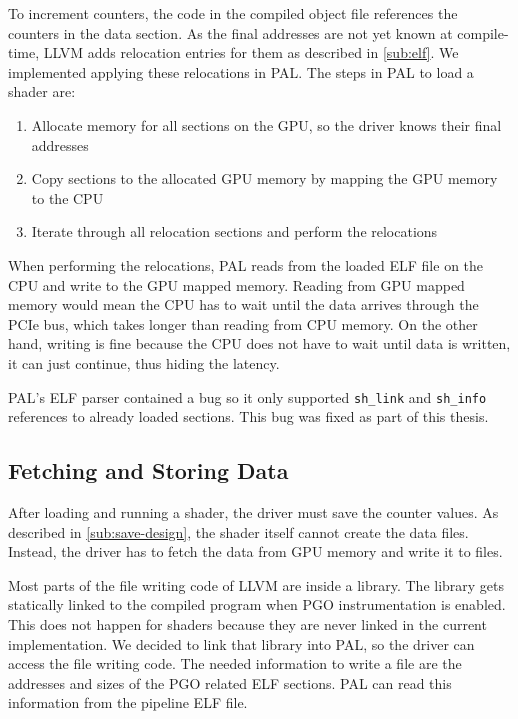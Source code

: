 To increment counters, the code in the compiled object file references the counters in the data section.
As the final addresses are not yet known at compile-time, LLVM adds relocation entries for them as described in \cref{sub:elf}.
We implemented applying these relocations in PAL. The steps in PAL to load a shader are:
\begin{enumerate}
	\item Allocate memory for all sections on the GPU, so the driver knows their final addresses
	\item Copy sections to the allocated GPU memory by mapping the GPU memory to the CPU
	\item Iterate through all relocation sections and perform the relocations
\end{enumerate}
When performing the relocations, PAL reads from the loaded ELF file on the CPU and write to the GPU mapped memory.
Reading from GPU mapped memory would mean the CPU has to wait until the data arrives through the PCIe bus, which takes longer than reading from CPU memory.
On the other hand, writing is fine because the CPU does not have to wait until data is written, it can just continue, thus hiding the latency.

PAL's ELF parser contained a bug so it only supported \texttt{sh\_link} and \texttt{sh\_info} references to already loaded sections. This bug was fixed as part of this thesis.


\subsection{Fetching and Storing Data}
\label{sub:save}
After loading and running a shader, the driver must save the counter values.
As described in \cref{sub:save-design}, the shader itself cannot create the data files.
Instead, the driver has to fetch the data from GPU memory and write it to files.

Most parts of the file writing code of LLVM are inside a library.
The library gets statically linked to the compiled program when PGO instrumentation is enabled.
This does not happen for shaders because they are never linked in the current implementation.
We decided to link that library into PAL, so the driver can access the file writing code.
The needed information to write a file are the addresses and sizes of the PGO related ELF sections.
PAL can read this information from the pipeline ELF file.

